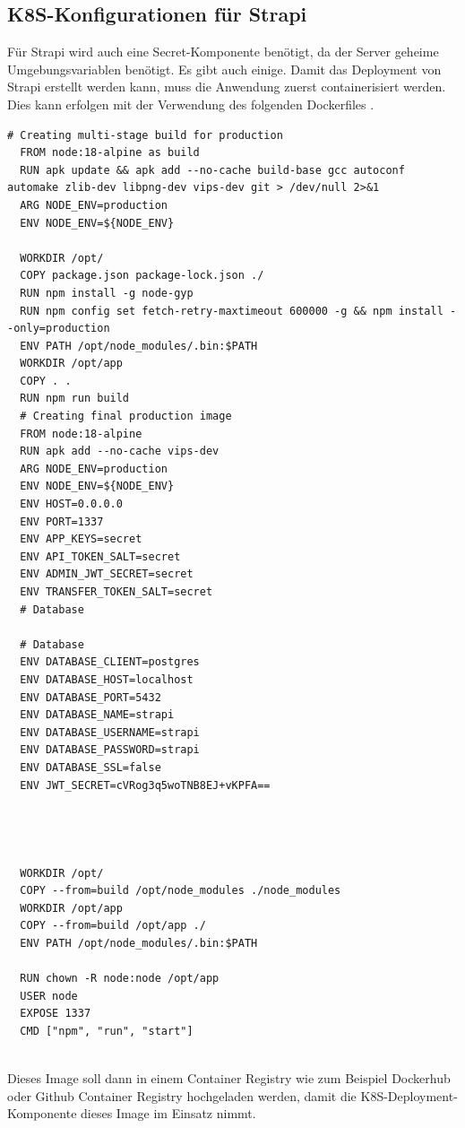 \subsection{K8S-Konfigurationen für Strapi}
Für Strapi wird auch eine Secret-Komponente benötigt, da der Server geheime Umgebungsvariablen benötigt.
Es gibt auch einige.
Damit das Deployment von Strapi erstellt werden kann, muss die Anwendung zuerst containerisiert werden. Dies kann erfolgen mit der Verwendung des folgenden Dockerfiles .
\begin{lstlisting}[caption=Strapi Dockerfile]
  # Creating multi-stage build for production
  FROM node:18-alpine as build
  RUN apk update && apk add --no-cache build-base gcc autoconf automake zlib-dev libpng-dev vips-dev git > /dev/null 2>&1
  ARG NODE_ENV=production
  ENV NODE_ENV=${NODE_ENV}
  
  WORKDIR /opt/
  COPY package.json package-lock.json ./
  RUN npm install -g node-gyp
  RUN npm config set fetch-retry-maxtimeout 600000 -g && npm install --only=production
  ENV PATH /opt/node_modules/.bin:$PATH
  WORKDIR /opt/app
  COPY . .
  RUN npm run build
  # Creating final production image
  FROM node:18-alpine
  RUN apk add --no-cache vips-dev
  ARG NODE_ENV=production
  ENV NODE_ENV=${NODE_ENV}
  ENV HOST=0.0.0.0
  ENV PORT=1337
  ENV APP_KEYS=secret
  ENV API_TOKEN_SALT=secret
  ENV ADMIN_JWT_SECRET=secret
  ENV TRANSFER_TOKEN_SALT=secret
  # Database
  
  # Database
  ENV DATABASE_CLIENT=postgres
  ENV DATABASE_HOST=localhost
  ENV DATABASE_PORT=5432
  ENV DATABASE_NAME=strapi
  ENV DATABASE_USERNAME=strapi
  ENV DATABASE_PASSWORD=strapi
  ENV DATABASE_SSL=false
  ENV JWT_SECRET=cVRog3q5woTNB8EJ+vKPFA==
  
  
  
  
  WORKDIR /opt/
  COPY --from=build /opt/node_modules ./node_modules
  WORKDIR /opt/app
  COPY --from=build /opt/app ./
  ENV PATH /opt/node_modules/.bin:$PATH
  
  RUN chown -R node:node /opt/app
  USER node
  EXPOSE 1337
  CMD ["npm", "run", "start"]
    
\end{lstlisting}

Dieses Image soll dann in einem Container Registry wie zum Beispiel
Dockerhub oder Github Container Registry hochgeladen werden,
damit die K8S-Deployment-Komponente dieses Image im Einsatz nimmt.




